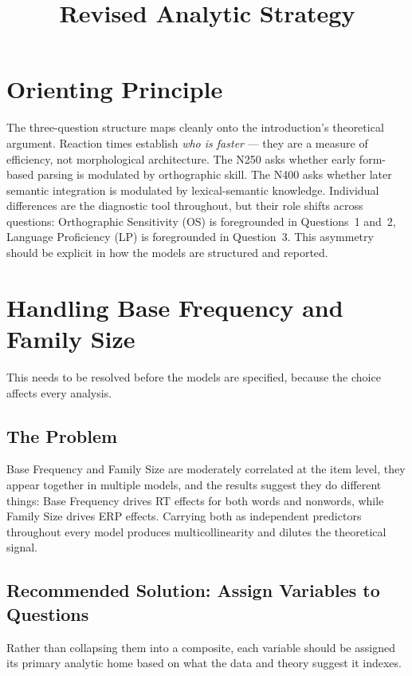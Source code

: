 \documentclass[12pt]{article}
\title{\textbf{Revised Analytic Strategy}}
\date{}
\begin{document}
	
	\maketitle
	
	\section{Orienting Principle}
	
	The three-question structure maps cleanly onto the introduction's theoretical argument. Reaction times establish \textit{who is faster} --- they are a measure of efficiency, not morphological architecture. The N250 asks whether early form-based parsing is modulated by orthographic skill. The N400 asks whether later semantic integration is modulated by lexical-semantic knowledge. Individual differences are the diagnostic tool throughout, but their role shifts across questions: Orthographic Sensitivity (OS) is foregrounded in Questions~1 and~2, Language Proficiency (LP) is foregrounded in Question~3. This asymmetry should be explicit in how the models are structured and reported.
	
	\section{Handling Base Frequency and Family Size}
	
	This needs to be resolved before the models are specified, because the choice affects every analysis.
	
	\subsection{The Problem}
	
	Base Frequency and Family Size are moderately correlated at the item level, they appear together in multiple models, and the results suggest they do different things: Base Frequency drives RT effects for both words and nonwords, while Family Size drives ERP effects. Carrying both as independent predictors throughout every model produces multicollinearity and dilutes the theoretical signal.
	
	\subsection{Recommended Solution: Assign Variables to Questions}
	
	Rather than collapsing them into a composite, each variable should be assigned its primary analytic home based on what the data and theory suggest it indexes.
	
\end{document}
